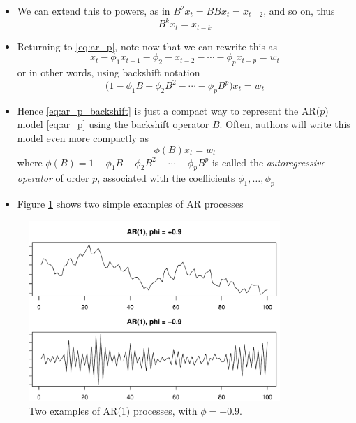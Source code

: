 \documentclass{article}
\begin{document}
\begin{itemize}
\item We can extend this to powers, as in $B^2 x_t = B B x_t = x_{t-2}$, and so
  on, thus   
  \[
  B^k x_t = x_{t-k} 
  \]

\item Returning to \eqref{eq:ar_p}, note now that we can rewrite this as 
  \[
  x_t - \phi_1 x_{t-1} - \phi_2 - x_{t-2} - \cdots - \phi_p x_{t-p} = w_t  
  \]
  or in other words, using backshift notation 
  \begin{equation}
  \label{eq:ar_p_backshift}
  \Big(1 - \phi_1 B - \phi_2 B^2 - \cdots - \phi_p B^p \Big) x_t = w_t 
  \end{equation}

\item Hence \eqref{eq:ar_p_backshift} is just a compact way to represent the
  AR($p$) model \eqref{eq:ar_p} using the backshift operator $B$. Often, authors
  will write this model even more compactly as  
  \begin{equation}
  \label{eq:ar_p_operator}
  \phi(B) x_t = w_t 
  \end{equation}
  where $\phi(B) = 1 - \phi_1 B - \phi_2 B^2 - \cdots - \phi_p B^p$ is called
  the \emph{autoregressive operator} of order $p$, associated with the
  coefficients $\phi_1,\dots,\phi_p$

\item Figure \ref{fig:ar} shows two simple examples of AR processes
\end{itemize}

\begin{figure}[htb]
\centering
\includegraphics[width=0.85\textwidth]{fig/ar-1.pdf}
\caption{Two examples of AR(1) processes, with $\phi = \pm 0.9$.}
\label{fig:ar}
\end{figure}
\end{document}
